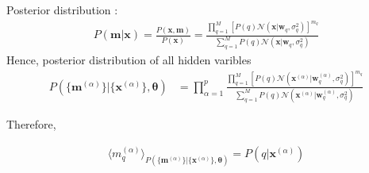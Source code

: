 Posterior distribution :
\begin{align*}
	P(\boldsymbol{m} | \boldsymbol{x} ) = \frac{P(\boldsymbol{x}, \boldsymbol{m})}{P(\boldsymbol{x})} = \frac{\prod_{q=1}^{M} [P(q) \mathcal{N}( \boldsymbol{x} | \boldsymbol{w}_q, \sigma_q^2 )]^{m_q}}{ \sum_{	q=1}^{M} P(q) \mathcal{N}( \boldsymbol{x} | \boldsymbol{w}_q, \sigma_q^2 )}
\end{align*}
Hence, posterior distribution of all hidden varibles
\begin{align*}
P( \{ \boldsymbol{m}^{(\alpha)} \}| \{ \boldsymbol{x}^{(\alpha)} \}, \boldsymbol{\theta} ) &= \prod_{\alpha=1}^p \frac{\prod_{q=1}^{M} [P(q) \mathcal{N}( \boldsymbol{x}^{(\alpha)} | \boldsymbol{w}_q^{(\alpha)}, \sigma_q^2 )]^{m_q}}{ \sum_{	q=1}^{M} P(q) \mathcal{N}( \boldsymbol{x}^{(\alpha)} | \boldsymbol{w}_q^{(\alpha)}, \sigma_q^2 )}
\end{align*}

Therefore, 

\begin{align*}
	\langle m_q^{(\alpha)} \rangle_{P( \{ \boldsymbol{m}^{(\alpha)} \}| \{ \boldsymbol{x}^{(\alpha)} \}, \boldsymbol{\theta} ) } = P(q|\boldsymbol{x}^{(\alpha)})
\end{align*}